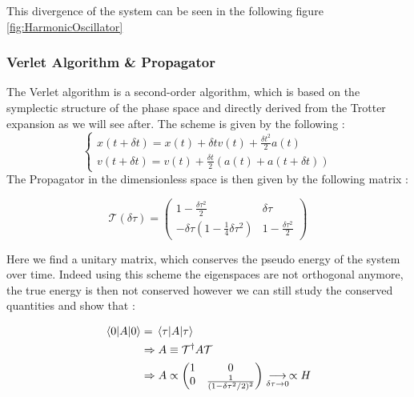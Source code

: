 \documentclass[ansiapaper]{report}
\begin{document}
\begin{multicols}{3}
  This divergence of the system can be seen in the following figure \cref{fig:HarmonicOscillator}

  \subsubsection{Verlet Algorithm \& Propagator}

  The Verlet algorithm is a second-order algorithm, which is based on the symplectic structure of the phase space and directly derived from the Trotter expansion as we will see after. The scheme is given by the following :
  $$
    \begin{cases}
      x(t + \delta t) = x(t) + \delta t v(t) + \frac{\delta t^2}{2} a(t) \\
      v(t + \delta t) = v(t) + \frac{\delta t}{2} (a(t) + a(t + \delta t))
    \end{cases}
  $$
  The Propagator in the dimensionless space is then given by the following matrix :

  $$ \mathcal{T}(\delta \tau) = \begin{pmatrix}
      1 - \frac{\delta \tau^2}{2}                             & \delta \tau                 \\
      -\delta \tau \left(1 - \frac{1}{4} \delta \tau^2\right) & 1 - \frac{\delta \tau^2}{2}
    \end{pmatrix}
  $$

  Here we find a unitary matrix, which conserves the pseudo energy of the system over time. Indeed using this scheme the eigenspaces are not orthogonal anymore, the true energy is then not conserved however we can still study the conserved quantities and show that :

  \begin{align*}
    \expval{A}{0} & = \expval{A}{\tau}
    \\ & \Rightarrow A \equiv \mathcal{T}^\dagger A \mathcal{T}
    \\ & \Rightarrow A \propto \begin{pmatrix}
      1 & 0                                 \\
      0 & \frac{1}{(1 - \delta \tau^2/2)^2}
    \end{pmatrix}\underset{\delta \tau \rightarrow 0}{\longrightarrow} \propto H
  \end{align*}



\end{multicols}
\end{document}
